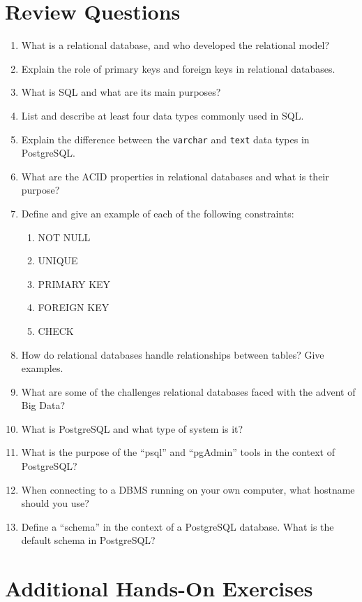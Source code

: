 \section{Review Questions}

\begin{enumerate}[nosep]
	\item What is a relational database, and who developed the relational model?
	\item Explain the role of primary keys and foreign keys in relational databases.
	\item What is SQL and what are its main purposes?
	\item List and describe at least four data types commonly used in SQL.
	\item Explain the difference between the \texttt{varchar} and \texttt{text} data types in PostgreSQL.
	\item What are the ACID properties in relational databases and what is their purpose?
	\item Define and give an example of each of the following constraints:
	\begin{enumerate}[label=\Alph*.]
		\item NOT NULL
		\item UNIQUE
		\item PRIMARY KEY
		\item FOREIGN KEY
		\item CHECK
	\end{enumerate}
	\item How do relational databases handle relationships between tables? Give examples.
	\item What are some of the challenges relational databases faced with the advent of Big Data?
    \item What is PostgreSQL and what type of system is it?
    \item What is the purpose of the ``psql'' and ``pgAdmin'' tools in the context of PostgreSQL?
    \item When connecting to a DBMS running on your own computer, what hostname should you use?
    \item Define a ``schema'' in the context of a PostgreSQL database. What is the default schema in PostgreSQL?
\end{enumerate}

    
\section{Additional Hands-On Exercises}

